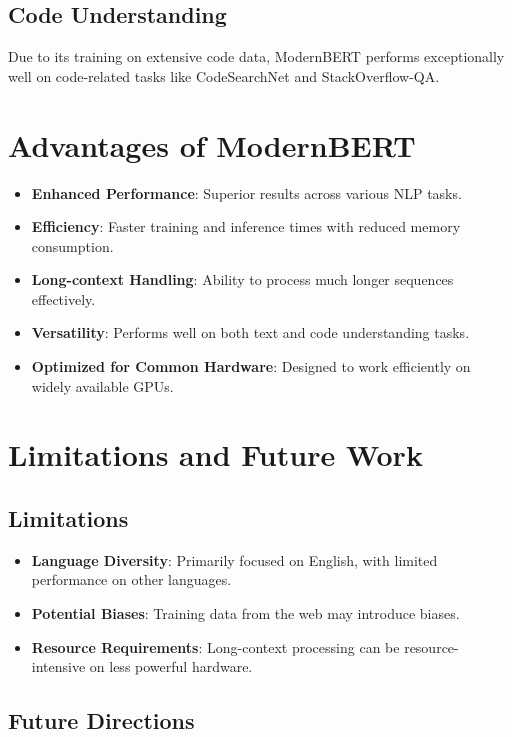 \documentclass{article}
\begin{document}
\subsection{Code Understanding}  
  
Due to its training on extensive code data, ModernBERT performs exceptionally well on code-related tasks like CodeSearchNet and StackOverflow-QA.  
  
\section{Advantages of ModernBERT}  
  
\begin{itemize}  
    \item \textbf{Enhanced Performance}: Superior results across various NLP tasks.  
    \item \textbf{Efficiency}: Faster training and inference times with reduced memory consumption.  
    \item \textbf{Long-context Handling}: Ability to process much longer sequences effectively.  
    \item \textbf{Versatility}: Performs well on both text and code understanding tasks.  
    \item \textbf{Optimized for Common Hardware}: Designed to work efficiently on widely available GPUs.  
\end{itemize}  
  
\section{Limitations and Future Work}  
  
\subsection{Limitations}  
  
\begin{itemize}  
    \item \textbf{Language Diversity}: Primarily focused on English, with limited performance on other languages.  
    \item \textbf{Potential Biases}: Training data from the web may introduce biases.  
    \item \textbf{Resource Requirements}: Long-context processing can be resource-intensive on less powerful hardware.  
\end{itemize}  
  
\subsection{Future Directions}  
  
\end{document}
